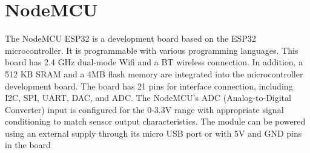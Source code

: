 \section{NodeMCU}
The NodeMCU ESP32 is a development board based on the ESP32
microcontroller. It is programmable with various programming
languages. This board has 2.4 GHz dual-mode Wifi and a BT wireless
connection. In addition, a 512 KB SRAM and a 4MB flash memory are
integrated into the microcontroller development board. The board has
21 pins for interface connection, including I2C, SPI, UART, DAC, and
ADC. The NodeMCU's ADC (Analog-to-Digital Converter) input is
configured for the 0-3.3V range with appropriate signal conditioning
to match sensor output characteristics.  The module can be powered
using an external supply through its micro USB port or with 5V and
GND pins in the board
